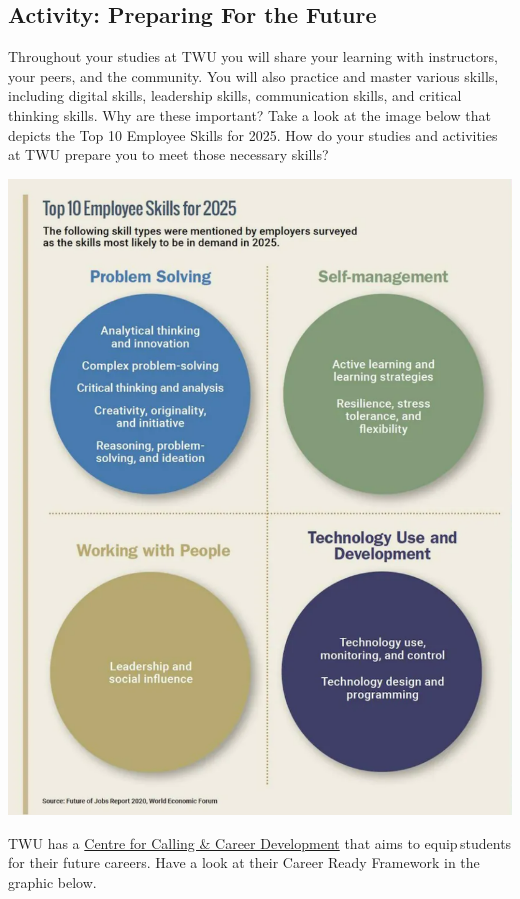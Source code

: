 \documentclass[
]{book}
\theoremstyle{definition}
\theoremstyle{definition}
\theoremstyle{definition}
\theoremstyle{definition}
\theoremstyle{remark}
\begin{document}
\hypertarget{activity-preparing-for-the-future}{%
\subsection*{Activity: Preparing For the Future}\label{activity-preparing-for-the-future}}

\begin{reflect}
Throughout your studies at TWU you will share your learning with instructors, your peers, and the community. You will also practice and master various skills, including digital skills, leadership skills, communication skills, and critical thinking skills. Why are these important? Take a look at the image below that depicts the Top 10 Employee Skills for 2025. How do your studies and activities at TWU prepare you to meet those necessary skills?

\includegraphics{assets/u6/Top Employee Skills 2025.png}

TWU has a \href{https://www.twu.ca/academics/academic-professional-support/centre-calling-career-development}{Centre for Calling \& Career Development} that aims to equip\,students for their future careers. Have a look at their Career Ready Framework in the graphic below.


\end{reflect}
\end{document}
